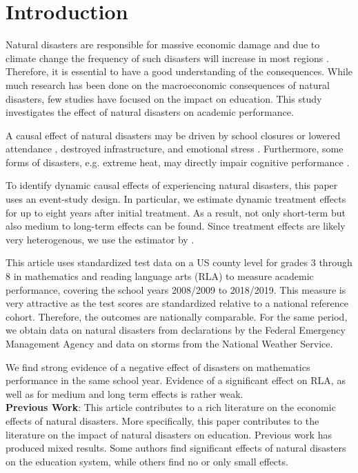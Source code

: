 
\section{Introduction}

Natural disasters are responsible for massive economic damage and due to climate change the frequency of such disasters will increase in most regions \citep{IPCC_2021}. Therefore, it is essential to have a good understanding of the consequences. While much research has been done on the macroeconomic consequences of natural disasters, few studies have focused on the impact on education. This study investigates the effect of natural disasters on academic performance.

A causal effect of natural disasters may be driven by school closures \citep{Grewening_2020} or lowered attendance \citep{Spencer_2016}, destroyed infrastructure, and emotional stress \citep{Vogel_2016}. Furthermore, some forms of disasters, e.g. extreme heat, may directly impair cognitive performance \citep{Ramsey_1995}.

To identify dynamic causal effects of experiencing natural disasters, this paper uses an event-study design. In particular, we estimate dynamic treatment effects for up to eight years after initial treatment. As a result, not only short-term but also medium to long-term effects can be found. Since treatment effects are likely very heterogenous, we use the estimator by \cite{Sun_2021}. 

This article uses standardized test data on a US county level for grades 3 through 8 in mathematics and reading language arts (RLA) to measure academic performance, covering the school years 2008/2009 to 2018/2019. This measure is very attractive as the test scores are standardized relative to a national reference cohort. Therefore, the outcomes are nationally comparable. For the same period, we obtain data on natural disasters from declarations by the Federal Emergency Management Agency and data on storms from the National Weather Service.

We find strong evidence of a negative effect of disasters on mathematics performance in the same school year. Evidence of a significant effect on RLA, as well as for medium and long term effects is rather weak.
\\

\textbf{Previous Work}: This article contributes to a rich literature on the economic effects of natural disasters. More specifically, this paper contributes to the literature on the impact of natural disasters on education. Previous work has produced mixed results. Some authors find significant effects of natural disasters on the education system, while others find no or only small effects.

